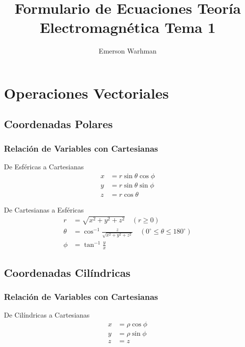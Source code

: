 \documentclass[12pt,a4paper,twocolumn]{article}
\title{Formulario de Ecuaciones Teoría Electromagnética Tema 1}
\author{Emerson Warhman}
\date{}
\begin{document}
\small
\maketitle

\section*{Operaciones Vectoriales}

\subsection*{Coordenadas Polares}

\subsubsection*{Relación de Variables con Cartesianas}

De Esféricas a Cartesianas
\begin{align*}
    x & = r \sin \theta \cos \phi \\
    y & = r \sin \theta \sin \phi \\
    z & = r \cos \theta
\end{align*}

De Cartesianas a Esféricas
\begin{align*}
    r      & = \sqrt{x^2 + y^2 + z^2} \quad (r \geq 0)                                               \\
    \theta & = \cos^{-1} \frac{z}{\sqrt{x^2 + y^2 + z^2}} \quad (0^\circ \leq \theta \leq 180^\circ) \\
    \phi   & = \tan^{-1} \frac{y}{x}
\end{align*}

\subsection*{Coordenadas Cilíndricas}

\subsubsection*{Relación de Variables con Cartesianas}

De Cilíndricas a Cartesianas
\begin{align*}
    x & = \rho \cos \phi \\
    y & = \rho \sin \phi \\
    z & = z
\end{align*}
\end{document}
